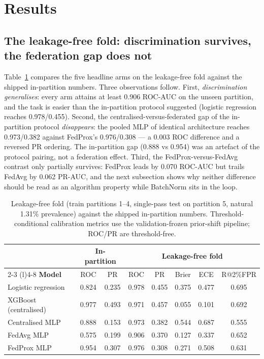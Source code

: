 \section{Results}\label{sec:results}

\subsection{The leakage-free fold: discrimination survives, the
federation gap does not}

Table~\ref{tab:leakfree} compares the five headline arms on the
leakage-free fold against the shipped in-partition numbers. Three
observations follow. First, \emph{discrimination generalises}: every
arm attains at least 0.906 ROC-AUC on the unseen partition, and the
task is easier than the in-partition protocol suggested (logistic
regression reaches 0.978/0.455). Second, the
centralised-versus-federated gap of the in-partition protocol
\emph{disappears}: the pooled MLP of identical architecture reaches
0.973/0.382 against FedProx's 0.976/0.308 --- a 0.003 ROC difference
and a reversed PR ordering. The in-partition gap (0.888 vs 0.954) was
an artefact of the protocol pairing, not a federation effect. Third,
the FedProx-versus-FedAvg contrast only partially survives: FedProx
leads by 0.070 ROC-AUC but trails FedAvg by 0.062 PR-AUC, and the
next subsection shows why neither difference should be read as an
algorithm property while BatchNorm sits in the loop.

\begin{table}[t]
\centering
\caption{Leakage-free fold (train partitions 1--4, single-pass test
on partition 5, natural 1.31\% prevalence) against the shipped
in-partition numbers. Threshold-conditional calibration metrics use
the validation-frozen prior-shift pipeline; ROC/PR are
threshold-free.}
\label{tab:leakfree}
\small
\begin{tabular}{@{}l c c c c c c c@{}}
\toprule
 & \multicolumn{2}{c}{\textbf{In-partition}} &
 \multicolumn{5}{c}{\textbf{Leakage-free fold}} \\
\cmidrule(r){2-3} \cmidrule(l){4-8}
\textbf{Model} & ROC & PR & ROC & PR & Brier & ECE & R@2\%FPR \\
\midrule
Logistic regression & 0.824 & 0.235 & 0.978 & 0.455 & 0.375 & 0.477 & 0.695 \\
XGBoost (centralised) & 0.977 & 0.493 & 0.971 & 0.457 & 0.055 & 0.101 & 0.692 \\
Centralised MLP & 0.888 & 0.153 & 0.973 & 0.382 & 0.544 & 0.687 & 0.555 \\
FedAvg MLP & 0.575 & 0.199 & 0.906 & 0.370 & 0.127 & 0.337 & 0.652 \\
FedProx MLP & 0.954 & 0.307 & 0.976 & 0.308 & 0.271 & 0.508 & 0.631 \\
\bottomrule
\end{tabular}
\end{table}

